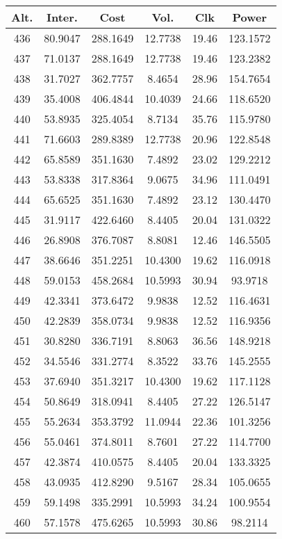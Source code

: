 \begin{center}
\begin{footnotesize}
\begin{tabular}{|c|ccccc|}
\hline
Alt. & Inter. & Cost & Vol. & Clk & Power\\
\hline
436 & 80.9047 & 288.1649 & 12.7738 & 19.46 & 123.1572 \\
437 & 71.0137 & 288.1649 & 12.7738 & 19.46 & 123.2382 \\
438 & 31.7027 & 362.7757 & 8.4654 & 28.96 & 154.7654 \\
439 & 35.4008 & 406.4844 & 10.4039 & 24.66 & 118.6520 \\
440 & 53.8935 & 325.4054 & 8.7134 & 35.76 & 115.9780 \\
441 & 71.6603 & 289.8389 & 12.7738 & 20.96 & 122.8548 \\
442 & 65.8589 & 351.1630 & 7.4892 & 23.02 & 129.2212 \\
443 & 53.8338 & 317.8364 & 9.0675 & 34.96 & 111.0491 \\
444 & 65.6525 & 351.1630 & 7.4892 & 23.12 & 130.4470 \\
445 & 31.9117 & 422.6460 & 8.4405 & 20.04 & 131.0322 \\
446 & 26.8908 & 376.7087 & 8.8081 & 12.46 & 146.5505 \\
447 & 38.6646 & 351.2251 & 10.4300 & 19.62 & 116.0918 \\
448 & 59.0153 & 458.2684 & 10.5993 & 30.94 & 93.9718 \\
449 & 42.3341 & 373.6472 & 9.9838 & 12.52 & 116.4631 \\
450 & 42.2839 & 358.0734 & 9.9838 & 12.52 & 116.9356 \\
451 & 30.8280 & 336.7191 & 8.8063 & 36.56 & 148.9218 \\
452 & 34.5546 & 331.2774 & 8.3522 & 33.76 & 145.2555 \\
453 & 37.6940 & 351.3217 & 10.4300 & 19.62 & 117.1128 \\
454 & 50.8649 & 318.0941 & 8.4405 & 27.22 & 126.5147 \\
455 & 55.2634 & 353.3792 & 11.0944 & 22.36 & 101.3256 \\
456 & 55.0461 & 374.8011 & 8.7601 & 27.22 & 114.7700 \\
457 & 42.3874 & 410.0575 & 8.4405 & 20.04 & 133.3325 \\
458 & 43.0935 & 412.8290 & 9.5167 & 28.34 & 105.0655 \\
459 & 59.1498 & 335.2991 & 10.5993 & 34.24 & 100.9554 \\
460 & 57.1578 & 475.6265 & 10.5993 & 30.86 & 98.2114 \\

\end{tabular}
\end{footnotesize}
\end{center}
